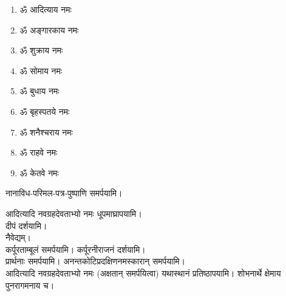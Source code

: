 \begin{enumerate}%
\item ॐ आदित्याय नमः
\item ॐ अङ्गारकाय नमः
\item ॐ शुक्राय नमः
\item ॐ सोमाय नमः
\item ॐ बुधाय नमः
\item ॐ बृहस्पतये नमः
\item ॐ शनैश्चराय नमः
\item ॐ राहवे नमः
\item ॐ केतवे नमः
\end{enumerate}

नानाविध-परिमल-पत्र-पुष्पाणि समर्पयामि।

आदित्यादि नवग्रहदेवताभ्यो नमः धूपमाघ्रापयामि।\\
दीपं दर्शयामि।\\
नैवेद्यम्। \\
कर्पूरताम्बूलं समर्पयामि। कर्पूरनीराजनं दर्शयामि।\\
प्रार्थनाः समर्पयामि।
अनन्तकोटिप्रदक्षिणनमस्कारान् समर्पयामि।\\

आदित्यादि नवग्रहदेवताभ्यो नमः (अक्षतान् समर्पयित्वा) यथास्थानं प्रतिष्ठापयामि। शोभनार्थे क्षेमाय पुनरागमनाय च।
